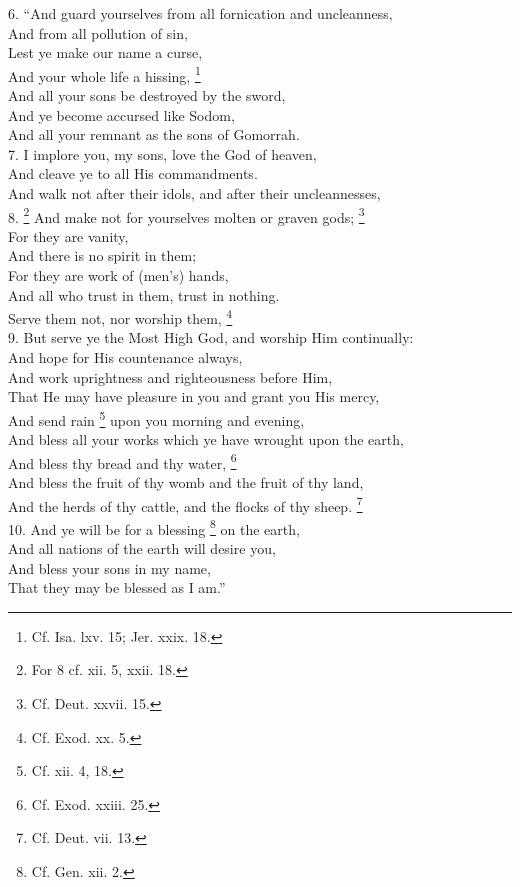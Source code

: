 6. ``And guard yourselves from all fornication and uncleanness,\\
And from all pollution of sin,\\
Lest ye make our name a curse,\\
And your whole life a hissing, \footnote{Cf. Isa. lxv. 15; Jer. xxix. 18.}\\
And all your sons be destroyed by the sword,\\
And ye become accursed like Sodom,\\
And all your remnant as the sons of Gomorrah.\\
7. I implore you, my sons, love the God of heaven,\\
And cleave ye to all His commandments. \\
And walk not after their idols, and after their uncleannesses,\\
8. \footnote{For 8 cf. xii. 5, xxii. 18.} And make not for yourselves molten or graven gods; \footnote{Cf. Deut. xxvii. 15.}\\
For they are vanity,\\
And there is no spirit in them;\\
For they are work of (men's) hands,\\
And all who trust in them, trust in nothing.\\
Serve them not, nor worship them, \footnote{Cf. Exod. xx. 5.}\\
9. But serve ye the Most High God, and worship Him continually:\\
And hope for His countenance always,\\
And work uprightness and righteousness before Him,\\
That He may have pleasure in you and grant you His mercy,\\
And send rain \footnote{Cf. xii. 4, 18.} upon you morning and evening,\\
And bless all your works which ye have wrought upon the earth,\\
And bless thy bread and thy water, \footnote{Cf. Exod. xxiii. 25.}\\
And bless the fruit of thy womb and the fruit of thy land,\\
And the herds of thy cattle, and the flocks of thy sheep. \footnote{Cf. Deut. vii. 13.}\\
10. And ye will be for a blessing \footnote{Cf. Gen. xii. 2.} on the earth,\\
And all nations of the earth will desire you,\\
And bless your sons in my name,\\
That they may be blessed as I am.''

